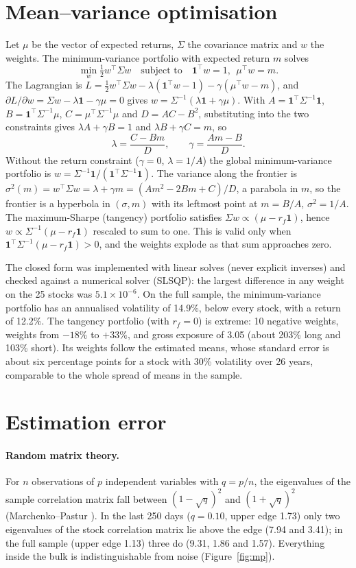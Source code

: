 \documentclass[11pt,a4paper]{article}
\newcommand{\ones}{\mathbf{1}}
\newcommand{\Sig}{\Sigma}
\begin{document}
\section{Mean--variance optimisation}
Let $\mu$ be the vector of expected returns, $\Sig$ the covariance matrix and $w$ the weights. The
minimum-variance portfolio with expected return $m$ solves
\[
\min_w \tfrac12 w^\top \Sig w \quad\text{subject to}\quad \ones^\top w = 1,\ \ \mu^\top w = m .
\]
The Lagrangian is $L = \tfrac12 w^\top\Sig w - \lambda(\ones^\top w - 1) - \gamma(\mu^\top w - m)$, and
$\partial L/\partial w = \Sig w - \lambda\ones - \gamma\mu = 0$ gives
$w = \Sig^{-1}(\lambda\ones + \gamma\mu)$. With
$A = \ones^\top\Sig^{-1}\ones$, $B = \ones^\top\Sig^{-1}\mu$, $C = \mu^\top\Sig^{-1}\mu$ and
$D = AC - B^2$, substituting into the two constraints gives $\lambda A + \gamma B = 1$ and
$\lambda B + \gamma C = m$, so
\[
\lambda = \frac{C - Bm}{D},\qquad \gamma = \frac{Am - B}{D}.
\]
Without the return constraint ($\gamma = 0$, $\lambda = 1/A$) the global minimum-variance portfolio is
$w = \Sig^{-1}\ones/(\ones^\top\Sig^{-1}\ones)$. The variance along the frontier is
$\sigma^2(m) = w^\top\Sig w = \lambda + \gamma m = (Am^2 - 2Bm + C)/D$, a parabola in $m$, so the
frontier is a hyperbola in $(\sigma, m)$ with its leftmost point at $m = B/A$, $\sigma^2 = 1/A$. The
maximum-Sharpe (tangency) portfolio satisfies $\Sig w \propto (\mu - r_f\ones)$, hence
$w \propto \Sig^{-1}(\mu - r_f\ones)$ rescaled to sum to one. This is valid only when
$\ones^\top\Sig^{-1}(\mu - r_f\ones) > 0$, and the weights explode as that sum approaches zero.

The closed form was implemented with linear solves (never explicit inverses) and checked against a
numerical solver (SLSQP): the largest difference in any weight on the 25 stocks was $5.1\times10^{-6}$.
On the full sample, the minimum-variance portfolio has an annualised volatility of 14.9\%, below every
stock, with a return of 12.2\%. The tangency portfolio (with $r_f = 0$) is extreme: 10 negative weights,
weights from $-18\%$ to $+33\%$, and gross exposure of 3.05 (about 203\% long and 103\% short). Its
weights follow the estimated means, whose standard error is about six percentage points for a stock with
30\% volatility over 26 years, comparable to the whole spread of means in the sample.

\section{Estimation error}
\paragraph{Random matrix theory.}
For $n$ observations of $p$ independent variables with $q = p/n$, the eigenvalues of the sample
correlation matrix fall between $(1-\sqrt q)^2$ and $(1+\sqrt q)^2$ (Marchenko--Pastur
\cite{marchenko1967}). In the last 250 days ($q = 0.10$, upper edge 1.73) only two eigenvalues of the
stock correlation matrix lie above the edge (7.94 and 3.41); in the full sample (upper edge 1.13) three
do (9.31, 1.86 and 1.57). Everything inside the bulk is indistinguishable from noise
(Figure~\ref{fig:mp}).
\end{document}
